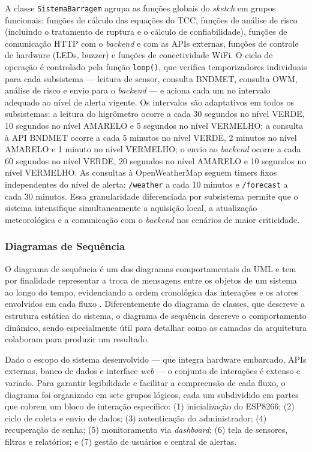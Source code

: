 A classe \texttt{SistemaBarragem} agrupa as funções globais do \textit{sketch} em
grupos funcionais: funções de cálculo das equações do TCC, funções de análise de
risco (incluindo o tratamento de ruptura e o cálculo de confiabilidade), funções de
comunicação HTTP com o \textit{backend} e com as APIs externas, funções de controle
de hardware (LEDs, buzzer) e funções de conectividade WiFi. O ciclo de operação é
controlado pela função \texttt{loop()}, que verifica temporizadores individuais para
cada subsistema — leitura de sensor, consulta BNDMET, consulta OWM, análise de risco
e envio para o \textit{backend} — e aciona cada um no intervalo adequado ao nível de
alerta vigente. Os intervalos são adaptativos em todos os subsistemas: a leitura do
higrômetro ocorre a cada 30 segundos no nível VERDE, 10 segundos no nível AMARELO
e 5 segundos no nível VERMELHO; a consulta à API BNDMET ocorre a cada 5 minutos no
nível VERDE, 2 minutos no nível AMARELO e 1 minuto no nível VERMELHO; o envio ao
\textit{backend} ocorre a cada 60 segundos no nível VERDE, 20 segundos no nível
AMARELO e 10 segundos no nível VERMELHO. As consultas à OpenWeatherMap seguem
timers fixos independentes do nível de alerta: \texttt{/weather} a cada 10 minutos e
\texttt{/forecast} a cada 30 minutos. Essa granularidade diferenciada por subsistema
permite que o sistema intensifique simultaneamente a aquisição local, a atualização
meteorológica e a comunicação com o \textit{backend} nos cenários de maior criticidade.

\subsubsection{Diagramas de Sequência}
\label{subsubsec:sequencia}

O diagrama de sequência é um dos diagramas comportamentais da UML e tem por
finalidade representar a troca de mensagens entre os objetos de um sistema ao longo
do tempo, evidenciando a ordem cronológica das interações e os atores envolvidos em
cada fluxo \cite{guedes2011uml}. Diferentemente do diagrama de classes, que descreve
a estrutura estática do sistema, o diagrama de sequência descreve o comportamento
dinâmico, sendo especialmente útil para detalhar como as camadas da arquitetura
colaboram para produzir um resultado.

Dado o escopo do sistema desenvolvido — que integra hardware embarcado, APIs
externas, banco de dados e interface \textit{web} — o conjunto de interações é extenso
e variado. Para garantir legibilidade e facilitar a compreensão de cada fluxo, o diagrama
foi organizado em sete grupos lógicos, cada um subdividido em partes que cobrem um
bloco de interação específico: (1) inicialização do ESP8266; (2) ciclo de coleta e envio
de dados; (3) autenticação do administrador; (4) recuperação de senha; (5) monitoramento
via \textit{dashboard}; (6) tela de sensores, filtros e relatórios; e (7) gestão de
usuários e central de alertas.

